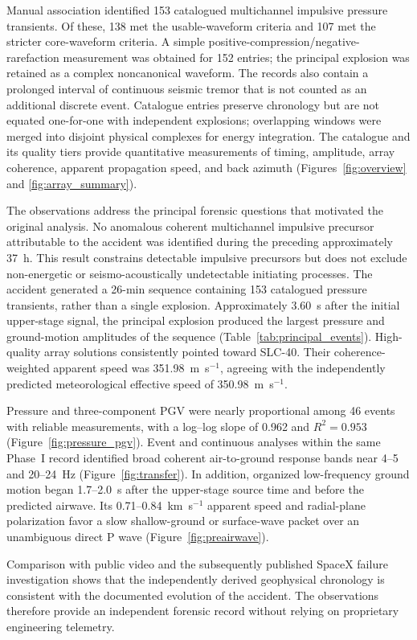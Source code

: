 \documentclass[]{seismica}
\begin{document}
Manual association identified 153 catalogued multichannel impulsive pressure
transients. Of these, 138 met the usable-waveform criteria and 107 met the
stricter core-waveform criteria. A simple
positive-compression/negative-rarefaction measurement was obtained for 152
entries; the principal explosion was retained as a complex noncanonical
waveform. The records also contain a prolonged interval of continuous seismic
tremor that is not counted as an additional discrete event. Catalogue entries
preserve chronology but are not equated one-for-one with independent
explosions; overlapping windows were merged into disjoint physical complexes
for energy integration. The catalogue and its quality tiers provide
quantitative measurements of timing, amplitude, array coherence, apparent
propagation speed, and back azimuth (Figures~\ref{fig:overview} and
\ref{fig:array_summary}).

The observations address the principal forensic questions that motivated the
original analysis. No anomalous coherent multichannel impulsive precursor
attributable to the accident was identified during the preceding approximately
37~h. This result constrains detectable impulsive precursors but does not
exclude non-energetic or seismo-acoustically undetectable initiating processes.
The accident generated a 26-min sequence containing 153 catalogued pressure
transients, rather than a single explosion. Approximately 3.60~s after the initial
upper-stage signal, the principal explosion produced the largest pressure and
ground-motion amplitudes of the sequence (Table~\ref{tab:principal_events}).
High-quality array solutions consistently pointed toward SLC-40. Their
coherence-weighted apparent speed was 351.98~m~s$^{-1}$, agreeing with the
independently predicted meteorological effective speed of
350.98~m~s$^{-1}$.

Pressure and three-component PGV were nearly proportional among 46 events with
reliable measurements, with a log--log slope of 0.962 and $R^2=0.953$
(Figure~\ref{fig:pressure_pgv}). Event and continuous analyses within the same
Phase~I record identified broad coherent air-to-ground response bands near
4--5 and 20--24~Hz (Figure~\ref{fig:transfer}). In addition, organized
low-frequency ground motion began 1.7--2.0~s after the upper-stage source time
and before the predicted airwave. Its 0.71--0.84~km~s$^{-1}$ apparent speed and
radial-plane polarization favor a slow shallow-ground or surface-wave packet
over an unambiguous direct P wave (Figure~\ref{fig:preairwave}).

Comparison with public video and the subsequently published SpaceX failure investigation shows that the independently derived geophysical chronology is consistent with the documented evolution of the accident. The observations therefore provide an independent forensic record without relying on proprietary engineering telemetry.
\end{document}
